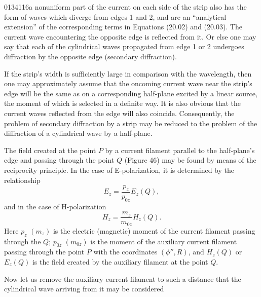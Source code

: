 \begin{scanpage}{0134}{116a}
nonuniform part of the current on each side of the strip also has the form of waves which diverge from edges 1 and 2, and are an ``analytical extension'' of the corresponding terms in Equations (20.02) and (20.03). The current wave encountering the opposite edge is reflected from it. Or else one may say that each of the cylindrical waves propagated from edge 1 or 2 undergoes diffraction by the opposite edge (secondary diffraction).

If the strip's width is sufficiently large in comparison with the wavelength, then one may approximately assume that the oncoming current wave near the strip's edge will be the same as on a corresponding half-plane excited by a linear source, the moment of which is selected in a definite way. It is also obvious that the current waves reflected from the edge will also coincide. Consequently, the problem of secondary diffraction by a strip may be reduced to the problem of the diffraction of a cylindrical wave by a half-plane.

The field created at the point $P$ by a current filament parallel to the half-plane's edge and passing through the point $Q$ (Figure 46) may be found by means of the reciprocity principle. In the case of E-polarization, it is determined by the relationship
\[E_z=\frac{p_z}{p_{0z}}E_z(Q),\tag{20.06}\]
and in the case of H-polarization
\[H_z=\frac{m_z}{m_{0z}}H_z(Q).\tag{20.07}\]
Here $p_z$ $(m_z)$ is the electric (magnetic) moment of the current filament passing through the $Q$; $p_{0z}$ $(m_{0z})$ is the moment of the auxiliary current filament passing through the point $P$ with the coordinates $(\phi'',R)$, and $H_z(Q)$ or $E_z(Q)$ is the field created by the auxiliary filament at the point $Q$.

Now let us remove the auxiliary current filament to such a distance that the cylindrical wave arriving from it may be considered
\end{scanpage}
